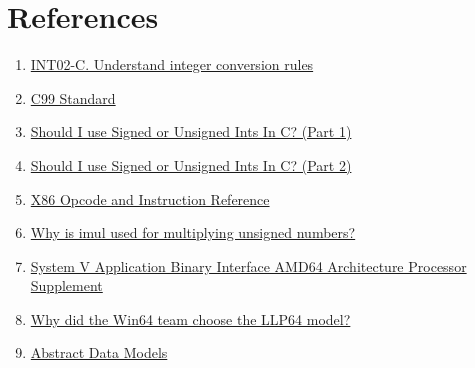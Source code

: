 \documentclass{article}
\begin{document}
\section{References}
\begin{enumerate}[noitemsep]
\item \href{https://wiki.sei.cmu.edu/confluence/display/c/INT02-C.+Understand+integer+conversion+rules}{INT02-C. Understand integer conversion rules}
\item \href{http://www.open-std.org/jtc1/sc22/wg14/www/docs/n1256.pdf}{C99 Standard}
\item \href{http://blog.robertelder.org/signed-or-unsigned/}{Should I use Signed or Unsigned Ints In C? (Part 1)}
\item \href{http://blog.robertelder.org/signed-or-unsigned-part-2/}{Should I use Signed or Unsigned Ints In C? (Part 2)}
\item \href{http://ref.x86asm.net/coder-abc.html}{X86 Opcode and Instruction Reference}
\item \href{https://stackoverflow.com/a/42589535/2407966}{Why is imul used for multiplying unsigned numbers?}
\item \href{http://www.unix.org/version2/whatsnew/lp64_wp.html}{System V Application Binary Interface AMD64 Architecture Processor Supplement}
\item \href{https://software.intel.com/sites/default/files/article/402129/mpx-linux64-abi.pdf}{Why did the Win64 team choose the LLP64 model?}
\item \href{https://blogs.msdn.microsoft.com/oldnewthing/20050131-00/?p=36563}{Abstract Data Models}

\end{enumerate}
\end{document}
